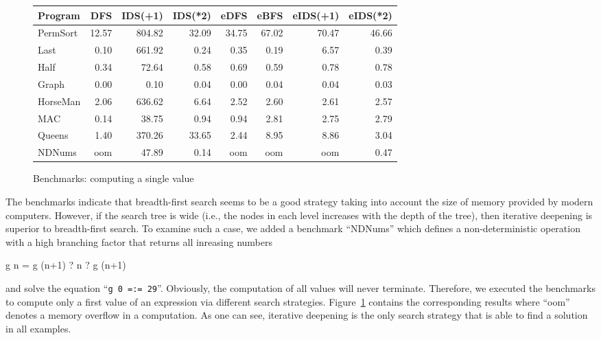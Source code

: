 \documentclass[english]{lni}
\newcommand{\code}[1]{\texttt{\small{}#1}}
\newcommand{\ccode}[1]{``\code{#1}''}
\begin{document}
\begin{figure}[t]
\centering
\begin{tabular}{|@{~~}l@{~~}|*{7}{@{~~}r@{~~}|}}
\hline
Program  &   DFS  & IDS(+1)& IDS(*2)&  eDFS  &  eBFS  &eIDS(+1)&eIDS(*2)\\
\hline
PermSort &  12.57 & 804.82 &  32.09 &  34.75 &  67.02 &  70.47 &  46.66 \\
Last     &   0.10 & 661.92 &   0.24 &   0.35 &   0.19 &   6.57 &   0.39 \\
Half     &   0.34 &  72.64 &   0.58 &   0.69 &   0.59 &   0.78 &   0.78 \\
Graph    &   0.00 &   0.10 &   0.04 &   0.00 &   0.04 &   0.04 &   0.03 \\
HorseMan &   2.06 & 636.62 &   6.64 &   2.52 &   2.60 &   2.61 &   2.57 \\
MAC      &   0.14 &  38.75 &   0.94 &   0.94 &   2.81 &   2.75 &   2.79 \\
Queens   &   1.40 & 370.26 &  33.65 &   2.44 &   8.95 &   8.86 &   3.04 \\
NDNums   &   oom  &  47.89 &   0.14 &    oom &   oom  &    oom &   0.47 \\
\hline
\end{tabular}
\caption{Benchmarks: computing a single value}
\label{fig:bench-first-solution}
\end{figure}

The benchmarks indicate that breadth-first search seems to be a good strategy
taking into account the size of memory provided by modern computers.
However, if the search tree is wide (i.e., the nodes in each level
increases with the depth of the tree),
then iterative deepening is superior to breadth-first search.
To examine such a case, we added a benchmark ``NDNums''
which defines a non-deterministic operation
with a high branching factor that returns all inreasing numbers
\begin{curry}
g n = g (n+1) ? n ? g (n+1)
\end{curry}
and solve the equation \ccode{g 0 =:= 29}.
Obviously, the computation of all values will never terminate.
Therefore, we executed the benchmarks to compute
only a first value of an expression via different search strategies.
Figure~\ref{fig:bench-first-solution} contains the
corresponding results where
``oom'' denotes a memory overflow in a computation.
As one can see, iterative deepening is the only search strategy
that is able to find a solution in all examples.


\end{document}
